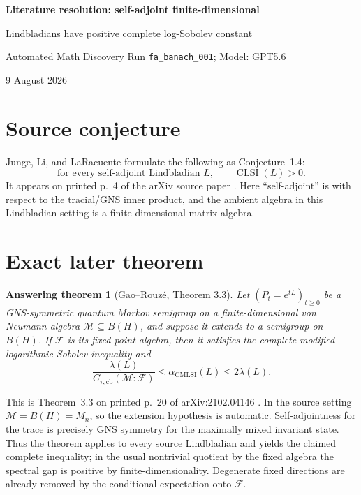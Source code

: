 \documentclass[10pt]{article}
\newtheorem*{answer}{Answering theorem}
\begin{document}
\begin{center}
{\Large\bfseries Literature resolution: self-adjoint finite-dimensional\par
Lindbladians have positive complete log-Sobolev constant\par}
\medskip
Automated Math Discovery Run \texttt{fa\_banach\_001}; Model: GPT5.6\par
9 August 2026
\end{center}
\medskip

\begin{center}
\end{center}

\section*{Source conjecture}
Junge, Li, and LaRacuente formulate the following as Conjecture~1.4:
\[
  \text{for every self-adjoint Lindbladian }L,
  \qquad \operatorname{CLSI}(L)>0.
\]
It appears on printed p.~4 of the arXiv source paper
\cite[p.~4, Conjecture~1.4]{JLL}.  Here ``self-adjoint'' is with respect to
the tracial/GNS inner product, and the ambient algebra in this Lindbladian
setting is a finite-dimensional matrix algebra.

\section*{Exact later theorem}
\begin{answer}[Gao--Rouz\'e, Theorem 3.3]
Let $(P_t=e^{tL})_{t\geq0}$ be a GNS-symmetric quantum Markov semigroup on a
finite-dimensional von Neumann algebra $\mathcal M\subseteq B(H)$, and suppose
it extends to a semigroup on $B(H)$.  If $\mathcal F$ is its fixed-point
algebra, then it satisfies the complete modified logarithmic Sobolev
inequality and
\[
 \frac{\lambda(L)}{C_{\tau,\mathrm{cb}}(\mathcal M:\mathcal F)}
 \leq \alpha_{\mathrm{CMLSI}}(L)\leq 2\lambda(L).
\]
\end{answer}
This is Theorem~3.3 on printed p.~20 of arXiv:2102.04146
\cite[p.~20, Theorem~3.3]{GR}.  In the source setting
$\mathcal M=B(H)=M_n$, so the extension hypothesis is automatic.
Self-adjointness for the trace is precisely GNS symmetry for the maximally
mixed invariant state.  Thus the theorem applies to every source
Lindbladian and yields the claimed complete inequality; in the usual
nontrivial quotient by the fixed algebra the spectral gap is positive by
finite-dimensionality.  Degenerate fixed directions are already removed by
the conditional expectation onto $\mathcal F$.
\end{document}
